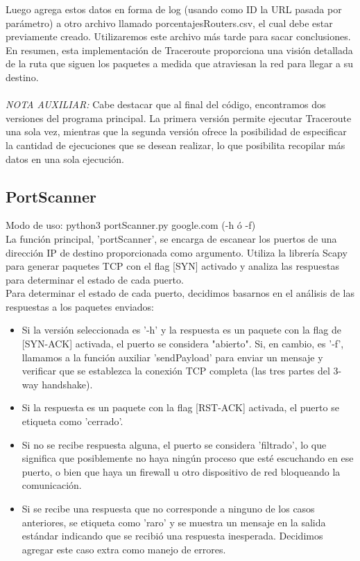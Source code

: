 \documentclass{article}
\begin{document}
        Luego agrega estos datos en forma de log (usando como ID la URL pasada por parámetro) a otro archivo llamado porcentajesRouters.csv, el cual debe estar previamente creado. Utilizaremos este archivo más tarde para sacar conclusiones.\\
        En resumen, esta implementación de Traceroute proporciona una visión detallada de la ruta que siguen los paquetes a medida que atraviesan la red para llegar a su destino.\\
        \\
        \textit{NOTA AUXILIAR:} Cabe destacar que al final del código, encontramos dos versiones del programa principal. La primera versión permite ejecutar Traceroute una sola vez, mientras que la segunda versión ofrece la posibilidad de especificar la cantidad de ejecuciones que se desean realizar, lo que posibilita recopilar más datos en una sola ejecución.
        \\

    \subsection{PortScanner}
        Modo de uso: python3 portScanner.py google.com (-h ó -f)
        \\
        La función principal, 'portScanner', se encarga de escanear los puertos de una dirección IP de destino proporcionada como argumento. Utiliza la librería Scapy para generar paquetes TCP con el flag [SYN] activado y analiza las respuestas para determinar el estado de cada puerto.\\
        Para determinar el estado de cada puerto, decidimos basarnos en el análisis de las respuestas a los paquetes enviados:\\
       
        \begin{itemize}[label=$\circ$]
            \item Si la versión seleccionada es '-h' y la respuesta es un paquete con la flag de [SYN-ACK] activada, el puerto se considera "abierto". Si, en cambio, es '-f', llamamos a la función auxiliar 'sendPayload' para enviar un mensaje y verificar que se establezca la conexión TCP completa (las tres partes del 3-way handshake).
            \item Si la respuesta es un paquete con la flag [RST-ACK] activada, el puerto se etiqueta como 'cerrado'.
            \item Si no se recibe respuesta alguna, el puerto se considera 'filtrado', lo que significa que posiblemente no haya ningún proceso que esté escuchando en ese puerto, o bien que haya un firewall u otro dispositivo de red bloqueando la comunicación.
            \item Si se recibe una respuesta que no corresponde a ninguno de los casos anteriores, se etiqueta como 'raro' y se muestra un mensaje en la salida estándar indicando que se recibió una respuesta inesperada. Decidimos agregar este caso extra como manejo de errores.
        \end{itemize}
    
\end{document}
